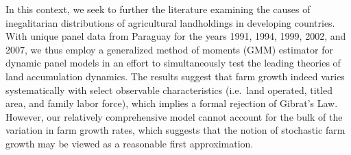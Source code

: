 \documentclass[english]{article}
\begin{document}




In this context, we seek to further the literature examining the causes of 
inegalitarian distributions of agricultural landholdings in developing 
countries.
With unique panel data from Paraguay for the years 1991, 1994, 1999, 2002, 
and 2007, we thus employ a generalized method of moments (GMM) 
estimator for dynamic panel models in an effort to simultaneously test the 
leading theories of land accumulation dynamics.
The results suggest that farm growth indeed varies systematically with select 
observable characteristics 
(i.e.\ land operated, titled area, and family labor force), which implies a formal 
rejection of Gibrat's Law. 
However, our relatively comprehensive model cannot account for the bulk of 
the variation in farm growth rates, which suggests that the notion of 
stochastic farm growth may be viewed as a reasonable first approximation.
\end{document}
